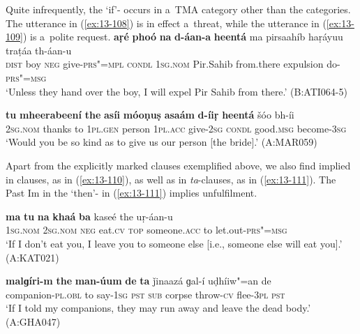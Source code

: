 Quite infrequently, the `if'- occurs in a~TMA category other than the  categories. The utterance in (\ref{ex:13-108}) is in effect a~threat, while the utterance in (\ref{ex:13-109}) is a~polite request.
\ea
\label{ex:13-108}
\gll \textbf{aṛé} \textbf{phoó} \textbf{na} \textbf{d-áan-a} \textbf{heentá} ma pirsaahíb haṛáyuu traṭáa th-áan-u\\
 \textsc{dist}{\protect\footnotemark} boy \textsc{neg} give-\textsc{prs"=mpl} \textsc{condl} \textsc{1sg.nom} Pir.Sahib from.there expulsion do-\textsc{prs"=msg}\\
\glt `Unless they hand over the boy, I will expel Pir Sahib from there.' (B:ATI064-5)

\ex
\label{ex:13-109}
\gll \textbf{tu} \textbf{mheerabeení} \textbf{the} \textbf{asíi} \textbf{móoṇuṣ} \textbf{asaám} \textbf{d-íiṛ} \textbf{ heentá} šóo bh-íi  \\
\textsc{2sg.nom} thanks to \textsc{1pl.gen} person \textsc{1pl.acc} give-\textsc{2sg}  \textsc{condl} good.\textsc{msg} become-\textsc{3sg} \\
\glt `Would you be so kind as to give us our person [the bride].' (A:MAR059) 
\z



Apart from the explicitly marked  clauses exemplified above, we also find  implied in  clauses, as in (\ref{ex:13-110}), as well as in \textit{ta}-clauses, as in (\ref{ex:13-111}). The Past Im in the `then'- in (\ref{ex:13-111}) implies unfulfilment.

\begin{exe}
\ex
\label{ex:13-110}
\gll \textbf{ma} \textbf{tu} \textbf{na} \textbf{khaá} \textbf{ba} kaseé the uṛ-áan-u\\
\textsc{1sg.nom} \textsc{2sg.nom} \textsc{neg} eat.\textsc{cv} \textsc{top} someone.\textsc{acc} to let.out-\textsc{prs"=msg}\\
\glt `If I don't eat you, I leave you to someone else [i.e., someone else will eat you].' (A:KAT021)

\ex
\label{ex:13-111}
\gll \label{bkm:Ref190830313}\textbf{malɡíri-m} \textbf{the} \textbf{man-úum} \textbf{de} \textbf{ta} ǰinaazá  ɡal-í uḍhíiw"=an de\\
companion-\textsc{pl.obl} to say-\textsc{1sg} \textsc{ pst} \textsc{sub} corpse throw-\textsc{cv} flee-\textsc{3pl} \textsc{ pst}\\
\glt `If I told my companions, they may run away and leave the dead body.' (A:GHA047) 
\end{exe}

